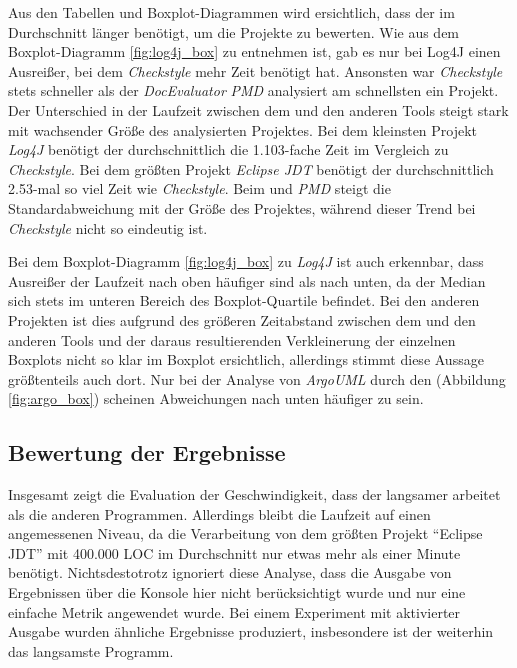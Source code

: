 Aus den Tabellen und Boxplot-Diagrammen wird ersichtlich, dass der \doceval im Durchschnitt länger benötigt, um die Projekte zu bewerten. Wie aus dem Boxplot-Diagramm \ref{fig:log4j_box} zu entnehmen ist, gab es nur bei Log4J einen Ausreißer, bei dem \textit{Checkstyle} mehr Zeit benötigt hat.   Ansonsten war \textit{Checkstyle} stets schneller als der \textit{DocEvaluator} \textit{PMD} analysiert am schnellsten ein Projekt. Der Unterschied in der Laufzeit zwischen dem \doceval und den anderen Tools steigt stark  mit wachsender Größe des analysierten Projektes.  Bei dem kleinsten Projekt \textit{Log4J} benötigt der \doceval  durchschnittlich die 1.103-fache Zeit im Vergleich zu \textit{Checkstyle}. Bei dem größten Projekt \textit{Eclipse \ac{JDT}} benötigt der \doceval durchschnittlich 2.53-mal so viel Zeit wie \textit{Checkstyle}. Beim \doceval und \textit{PMD} steigt die Standardabweichung mit der Größe des Projektes, während dieser Trend bei \textit{Checkstyle} nicht so eindeutig ist.

Bei dem Boxplot-Diagramm \ref{fig:log4j_box} zu \textit{Log4J} ist auch erkennbar, dass Ausreißer der Laufzeit nach oben häufiger sind als nach unten, da der Median sich stets im unteren Bereich des Boxplot-Quartile befindet. Bei den anderen Projekten ist dies aufgrund des größeren Zeitabstand  zwischen dem \doceval und den anderen Tools  und der daraus resultierenden Verkleinerung der einzelnen Boxplots  nicht so klar im Boxplot ersichtlich, allerdings stimmt diese Aussage größtenteils auch dort. Nur bei der Analyse von \textit{ArgoUML} durch den \doceval (Abbildung \ref{fig:argo_box}) scheinen Abweichungen nach unten häufiger zu sein.

\subsection{Bewertung der Ergebnisse}
Insgesamt zeigt die Evaluation der Geschwindigkeit, dass der \doceval langsamer arbeitet als die anderen Programmen. Allerdings  bleibt die Laufzeit auf einen angemessenen Niveau, da die Verarbeitung von dem größten Projekt \enquote{Eclipse \ac{JDT}} mit 400.000 \ac{LOC} im Durchschnitt nur etwas mehr als einer Minute benötigt. Nichtsdestotrotz ignoriert diese Analyse, dass die Ausgabe von Ergebnissen über die Konsole hier nicht berücksichtigt wurde und nur eine einfache Metrik angewendet wurde. Bei einem Experiment mit aktivierter Ausgabe wurden ähnliche Ergebnisse produziert, insbesondere ist der \doceval weiterhin das langsamste Programm. 

